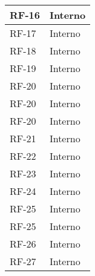 \begin{longtable}{|>{\centering\arraybackslash}m{}|>{\centering\arraybackslash}m{}|}
	RF-16              & Interno                                                                                                           \\\hline
	RF-17              & Interno                                                                                                           \\\hline
	RF-18              & Interno                                                                                                           \\\hline
	RF-19              & Interno                                                                                                           \\\hline
	RF-20              & Interno                                                                                                           \\\hline
	RF-20              & Interno                                                                                                           \\\hline
	RF-20              & Interno                                                                                                           \\\hline
	RF-21              & Interno                                                                                                           \\\hline
	RF-22              & Interno                                                                                                           \\\hline
	RF-23              & Interno                                                                                                           \\\hline
	RF-24              & Interno                                                                                                           \\\hline
	RF-25              & Interno                                                                                                           \\\hline
	RF-25              & Interno                                                                                                           \\\hline
	RF-26              & Interno                                                                                                           \\\hline
	RF-27              & Interno                                                                                                           \\\hline

\end{longtable}
